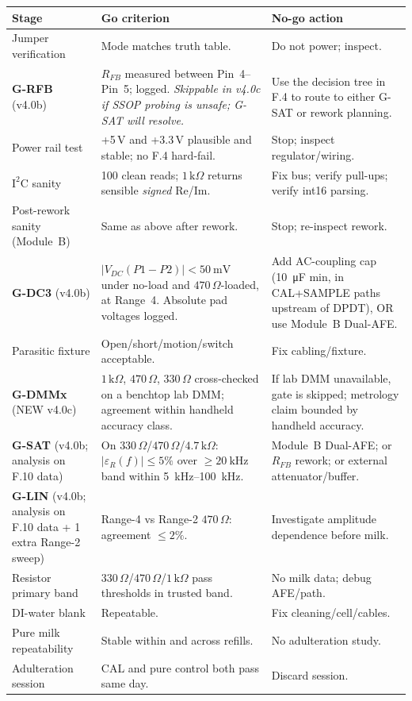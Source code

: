 \documentclass[11pt,a4paper]{article}
\newcommand{\kohm}[1]{\ensuremath{#1\,\mathrm{k}\Omega}}
\newcommand{\Rohm}[1]{\ensuremath{#1\,\Omega}}
\begin{document}
\begin{xltabular}{\textwidth}{L{38mm}L{45mm}Y}
\toprule
\textbf{Stage} & \textbf{Go criterion} & \textbf{No-go action}\\
\midrule
Jumper verification & Mode matches truth table. & Do not power; inspect.\\
\textbf{G-RFB} (v4.0b) & $R_{FB}$ measured between Pin~4--Pin~5; logged. \emph{Skippable in v4.0c if SSOP probing is unsafe; G-SAT will resolve.} & Use the decision tree in F.4 to route to either G-SAT or rework planning.\\
Power rail test & +5\,V and +3.3\,V plausible and stable; no F.4 hard-fail. & Stop; inspect regulator/wiring.\\
$\mathrm{I^2C}$ sanity & 100 clean reads; \kohm{1} returns sensible \emph{signed} Re/Im. & Fix bus; verify pull-ups; verify int16 parsing.\\
Post-rework sanity (Module~B) & Same as above after rework. & Stop; re-inspect rework.\\
\textbf{G-DC3} (v4.0b) & $|V_{DC}(P1\!-\!P2)| < \SI{50}{\milli\volt}$ under no-load and \Rohm{470}-loaded, at Range~4. Absolute pad voltages logged. & Add AC-coupling cap (\SI{10}{\micro\farad} min, in CAL+SAMPLE paths upstream of DPDT), OR use Module~B Dual-AFE.\\
Parasitic fixture & Open/short/motion/switch acceptable. & Fix cabling/fixture.\\
\textbf{G-DMMx} (NEW v4.0c) & \kohm{1}, \Rohm{470}, \Rohm{330} cross-checked on a benchtop lab DMM; agreement within handheld accuracy class. & If lab DMM unavailable, gate is skipped; metrology claim bounded by handheld accuracy.\\
\textbf{G-SAT} (v4.0b; analysis on F.10 data) & On \Rohm{330}/\Rohm{470}/\kohm{4.7}: $|\varepsilon_R(f)| \leq 5\%$ over $\geq\!\SI{20}{\kilo\hertz}$ band within \SIrange{5}{100}{\kilo\hertz}. & Module~B Dual-AFE; or $R_{FB}$ rework; or external attenuator/buffer.\\
\textbf{G-LIN} (v4.0b; analysis on F.10 data + 1 extra Range-2 sweep) & Range-4 vs Range-2 \Rohm{470}: agreement $\leq 2\%$. & Investigate amplitude dependence before milk.\\
Resistor primary band & \Rohm{330}/\Rohm{470}/\kohm{1} pass thresholds in trusted band. & No milk data; debug AFE/path.\\
DI-water blank & Repeatable. & Fix cleaning/cell/cables.\\
Pure milk repeatability & Stable within and across refills. & No adulteration study.\\
Adulteration session & CAL and pure control both pass same day. & Discard session.\\
\bottomrule
\end{xltabular}
\end{document}
